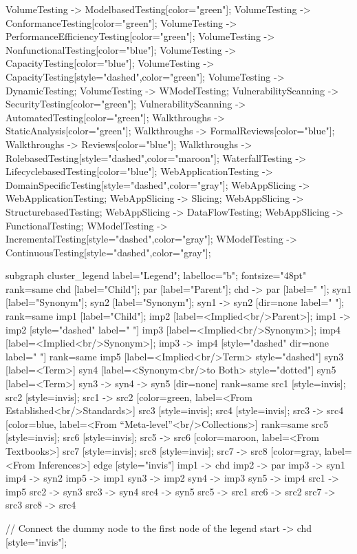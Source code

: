 \documentclass{article}
\begin{document}
{VolumeTesting -> ModelbasedTesting[color="green"];
VolumeTesting -> ConformanceTesting[color="green"];
VolumeTesting -> PerformanceEfficiencyTesting[color="green"];
VolumeTesting -> NonfunctionalTesting[color="blue"];
VolumeTesting -> CapacityTesting[color="blue"];
VolumeTesting -> CapacityTesting[style="dashed",color="green"];
VolumeTesting -> DynamicTesting;
VolumeTesting -> WModelTesting;
VulnerabilityScanning -> SecurityTesting[color="green"];
VulnerabilityScanning -> AutomatedTesting[color="green"];
Walkthroughs -> StaticAnalysis[color="green"];
Walkthroughs -> FormalReviews[color="blue"];
Walkthroughs -> Reviews[color="blue"];
Walkthroughs -> RolebasedTesting[style="dashed",color="maroon"];
WaterfallTesting -> LifecyclebasedTesting[color="blue"];
WebApplicationTesting -> DomainSpecificTesting[style="dashed",color="gray"];
WebAppSlicing -> WebApplicationTesting;
WebAppSlicing -> Slicing;
WebAppSlicing -> StructurebasedTesting;
WebAppSlicing -> DataFlowTesting;
WebAppSlicing -> FunctionalTesting;
WModelTesting -> IncrementalTesting[style="dashed",color="gray"];
WModelTesting -> ContinuousTesting[style="dashed",color="gray"];

subgraph cluster_legend {
    label="Legend";
    labelloc="b";
    fontsize="48pt"
    {
        rank=same
        chd [label="Child"];
        par [label="Parent"];
        chd -> par [label="                "];
        syn1 [label="Synonym"];
        syn2 [label="Synonym"];
        syn1 -> syn2 [dir=none label="                "];
    }
    {
        rank=same
        imp1 [label="Child"];
        imp2 [label=<Implied<br/>Parent>];
        imp1 -> imp2 [style="dashed" label="                "]
        imp3 [label=<Implied<br/>Synonym>];
        imp4 [label=<Implied<br/>Synonym>];
        imp3 -> imp4 [style="dashed" dir=none label="                "]
    }
    {
        rank=same
        imp5 [label=<Implied<br/>Term> style="dashed"]
        syn3 [label=<Term>]
        syn4 [label=<Synonym<br/>to Both> style="dotted"]
        syn5 [label=<Term>]
        syn3 -> syn4 -> syn5 [dir=none]
    }
{
rank=same
src1 [style=invis];
src2 [style=invis];
src1 -> src2 [color=green, label=<From Established<br/>Standards>]
src3 [style=invis];
src4 [style=invis];
src3 -> src4 [color=blue, label=<From ``Meta-level''<br/>Collections>]
}
{
rank=same
src5 [style=invis];
src6 [style=invis];
src5 -> src6 [color=maroon, label=<From Textbooks>]
src7 [style=invis];
src8 [style=invis];
src7 -> src8 [color=gray, label=<From Inferences>]
}
    edge [style="invis"]
    imp1 -> chd
    imp2 -> par
    imp3 -> syn1
    imp4 -> syn2
imp5 -> imp1
syn3 -> imp2
syn4 -> imp3
syn5 -> imp4
src1 -> imp5
src2 -> syn3
src3 -> syn4
src4 -> syn5
src5 -> src1
src6 -> src2
src7 -> src3
src8 -> src4
}

// Connect the dummy node to the first node of the legend
start -> chd [style="invis"];
}
\end{document}
